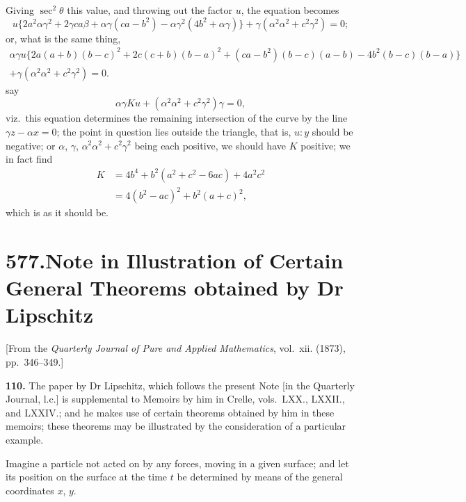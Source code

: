 \documentclass[11pt,a4paper]{book}
\begin{document}
Giving $\sec^2\theta$ this value, and throwing out the factor $u$, the equation becomes
\[
u\{2a^2\alpha\gamma^2 + 2\gamma ca\beta + \alpha\gamma(ca - b^2) - \alpha\gamma^2(4b^2 + \alpha\gamma)\} + \gamma(\alpha^2\alpha^2 + c^2\gamma^2) = 0;
\]
or, what is the same thing,
\begin{multline*}
\alpha\gamma u\{2a(a + b)(b - c)^2 + 2c(c + b)(b - a)^2 + (ca - b^2)(b - c)(a - b) - 4b^2(b - c)(b - a)\} \\
+ \gamma(\alpha^2\alpha^2 + c^2\gamma^2) = 0.
\end{multline*}
say
\[
\alpha\gamma Ku + (\alpha^2\alpha^2 + c^2\gamma^2)\gamma = 0,
\]
viz.\ this equation determines the remaining intersection of the curve by the line $\gamma z - \alpha x = 0$; the point in question lies outside the triangle, that is, $u : y$ should be negative; or $\alpha$, $\gamma$, $\alpha^2\alpha^2 + c^2\gamma^2$ being each positive, we should have $K$ positive; we in fact find
\begin{align*}
K &= 4b^4 + b^2(a^2 + c^2 - 6ac) + 4a^2c^2 \\
&= 4(b^2 - ac)^2 + b^2(a + c)^2,
\end{align*}
which is as it should be.


\newpage
\section*{577.\quad Note in Illustration of Certain General Theorems obtained by Dr Lipschitz}

\begin{flushright}
\small[From the \textit{Quarterly Journal of Pure and Applied Mathematics}, vol.~xii. (1873), pp.~346--349.]
\end{flushright}

\noindent\textbf{110.} The paper by Dr Lipschitz, which follows the present Note [in the Quarterly Journal, l.c.] is supplemental to Memoirs by him in Crelle, vols.~LXX., LXXII., and LXXIV.; and he makes use of certain theorems obtained by him in these memoirs; these theorems may be illustrated by the consideration of a particular example.

Imagine a particle not acted on by any forces, moving in a given surface; and let its position on the surface at the time $t$ be determined by means of the general coordinates $x$, $y$.
\end{document}
